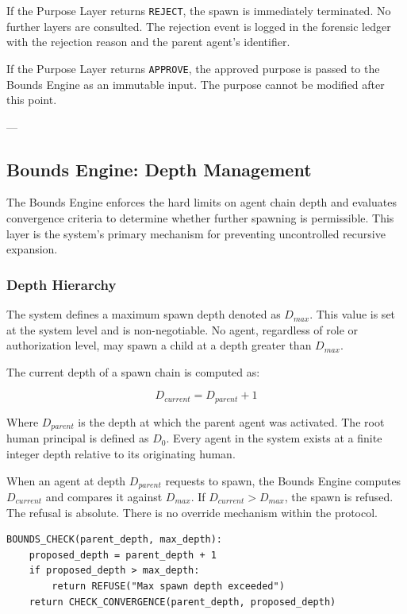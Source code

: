If the Purpose Layer returns \texttt{REJECT}, the spawn is immediately terminated. No further layers are consulted. The rejection event is logged in the forensic ledger with the rejection reason and the parent agent's identifier.

If the Purpose Layer returns \texttt{APPROVE}, the approved purpose is passed to the Bounds Engine as an immutable input. The purpose cannot be modified after this point.

---

\subsection{Bounds Engine: Depth Management}

The Bounds Engine enforces the hard limits on agent chain depth and evaluates convergence criteria to determine whether further spawning is permissible. This layer is the system's primary mechanism for preventing uncontrolled recursive expansion.

\subsubsection{Depth Hierarchy}

The system defines a maximum spawn depth denoted as $D_{max}$. This value is set at the system level and is non-negotiable. No agent, regardless of role or authorization level, may spawn a child at a depth greater than $D_{max}$.

The current depth of a spawn chain is computed as:

\[
D_{current} = D_{parent} + 1
\]

Where $D_{parent}$ is the depth at which the parent agent was activated. The root human principal is defined as $D_0$. Every agent in the system exists at a finite integer depth relative to its originating human.

When an agent at depth $D_{parent}$ requests to spawn, the Bounds Engine computes $D_{current}$ and compares it against $D_{max}$. If $D_{current} > D_{max}$, the spawn is refused. The refusal is absolute. There is no override mechanism within the protocol.

\begin{verbatim}
BOUNDS_CHECK(parent_depth, max_depth):
    proposed_depth = parent_depth + 1
    if proposed_depth > max_depth:
        return REFUSE("Max spawn depth exceeded")
    return CHECK_CONVERGENCE(parent_depth, proposed_depth)
\end{verbatim}

